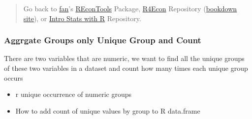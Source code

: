 \documentclass[
]{book}
\providecommand{\tightlist}{%
  \setlength{\itemsep}{0pt}\setlength{\parskip}{0pt}}
\begin{document}
\begin{quote}
Go back to \href{http://fanwangecon.github.io/CodeDynaAsset/}{fan}'s \href{https://fanwangecon.github.io/REconTools/}{REconTools} Package, \href{https://fanwangecon.github.io/R4Econ/}{R4Econ} Repository (\href{https://fanwangecon.github.io/R4Econ/bookdown}{bookdown site}), or \href{https://fanwangecon.github.io/Stat4Econ/}{Intro Stats with R} Repository.
\end{quote}

\hypertarget{aggrgate-groups-only-unique-group-and-count}{%
\subsubsection{Aggrgate Groups only Unique Group and Count}\label{aggrgate-groups-only-unique-group-and-count}}

There are two variables that are numeric, we want to find all the unique groups of these two variables in a dataset and count how many times each unique group occurs

\begin{itemize}
\tightlist
\item
  r unique occurrence of numeric groups
\item
  How to add count of unique values by group to R data.frame
\end{itemize}
\end{document}
